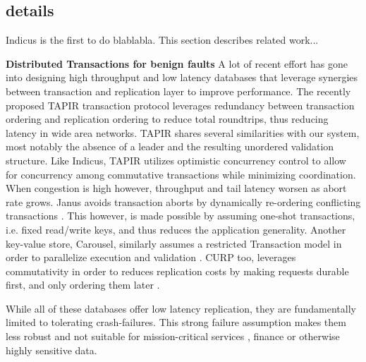 \subsection{details}


Indicus is the first to do blablabla. This section describes related work...

\textbf{Distributed Transactions for benign faults}
A lot of recent effort has gone into designing high throughput and low latency databases that leverage synergies between transaction and replication layer to improve performance. The recently proposed TAPIR transaction protocol leverages redundancy between transaction ordering and replication ordering to reduce total roundtrips, thus reducing latency in wide area networks. TAPIR shares several similarities with our system, most notably the absence of a leader and the resulting unordered validation structure. Like Indicus, TAPIR utilizes optimistic concurrency control to allow for concurrency among commutative transactions while minimizing coordination. When congestion is high however, throughput and tail latency worsen as abort rate grows. Janus avoids transaction aborts by dynamically re-ordering conflicting transactions \cite{mu2016consolidating}. This however, is made possible by assuming one-shot transactions, i.e. fixed read/write keys, and thus reduces the application generality. Another key-value store, Carousel, similarly assumes a restricted Transaction model in order to parallelize execution and validation \cite{yan2018carousel}. CURP too, leverages commutativity in order to reduces replication costs by making requests durable first, and only ordering them later \cite{park2019exploiting}. 

While all of these databases offer low latency replication, they are fundamentally limited to tolerating crash-failures. This strong failure assumption makes them less robust and not suitable for mission-critical services \cite{Abdollah2007}, finance or otherwise highly sensitive data.

